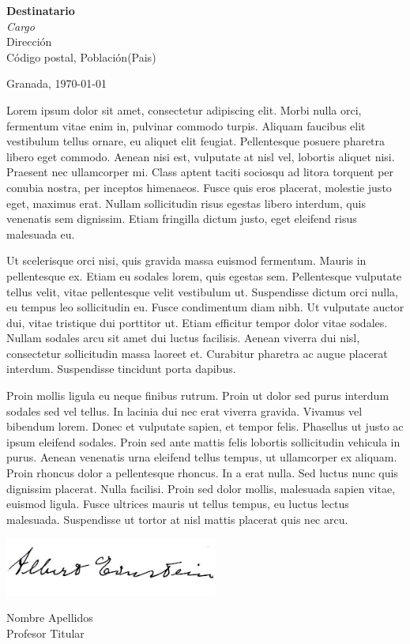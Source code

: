\documentclass{UGR-generico}
\newcommand{\miNombre}{Nombre Apellidos\xspace}
\newcommand{\miCargo}{Profesor Titular\xspace}
\newcommand{\desNombre}{Destinatario\xspace}
\newcommand{\desCargo}{Cargo\xspace}
\newcommand{\desDireccion}{Dirección\xspace}
\newcommand{\desCP}{Código postal\xspace}
\newcommand{\desPoblacion}{Población\xspace}
\newcommand{\desPais}{Pais\xspace}
\begin{document}
\thispagestyle{scrheadings}

\hfill\vfill
\textbf{\desNombre}\\
\textit{\desCargo}\\
\desDireccion \\
\desCP, \desPoblacion (\desPais)
\vfill

Granada, \today
\medskip

Lorem ipsum dolor sit amet, consectetur adipiscing elit. Morbi nulla orci, fermentum vitae enim in, pulvinar commodo turpis. Aliquam faucibus elit vestibulum tellus ornare, eu aliquet elit feugiat. Pellentesque posuere pharetra libero eget commodo. Aenean nisi est, vulputate at nisl vel, lobortis aliquet nisi. Praesent nec ullamcorper mi. Class aptent taciti sociosqu ad litora torquent per conubia nostra, per inceptos himenaeos. Fusce quis eros placerat, molestie justo eget, maximus erat. Nullam sollicitudin risus egestas libero interdum, quis venenatis sem dignissim. Etiam fringilla dictum justo, eget eleifend risus malesuada eu.

Ut scelerisque orci nisi, quis gravida massa euismod fermentum. Mauris in pellentesque ex. Etiam eu sodales lorem, quis egestas sem. Pellentesque vulputate tellus velit, vitae pellentesque velit vestibulum ut. Suspendisse dictum orci nulla, eu tempus leo sollicitudin eu. Fusce condimentum diam nibh. Ut vulputate auctor dui, vitae tristique dui porttitor ut. Etiam efficitur tempor dolor vitae sodales. Nullam sodales arcu sit amet dui luctus facilisis. Aenean viverra dui nisl, consectetur sollicitudin massa laoreet et. Curabitur pharetra ac augue placerat interdum. Suspendisse tincidunt porta dapibus.

Proin mollis ligula eu neque finibus rutrum. Proin ut dolor sed purus interdum sodales sed vel tellus. In lacinia dui nec erat viverra gravida. Vivamus vel bibendum lorem. Donec et vulputate sapien, et tempor felis. Phasellus ut justo ac ipsum eleifend sodales. Proin sed ante mattis felis lobortis sollicitudin vehicula in purus. Aenean venenatis urna eleifend tellus tempus, ut ullamcorper ex aliquam. Proin rhoncus dolor a pellentesque rhoncus. In a erat nulla. Sed luctus nunc quis dignissim placerat. Nulla facilisi. Proin sed dolor mollis, malesuada sapien vitae, euismod ligula. Fusce ultrices mauris ut tellus tempus, eu luctus lectus malesuada. Suspendisse ut tortor at nisl mattis placerat quis nec arcu. 

\vfill\vfill
\begin{center}

  \includegraphics[width=7cm]{img/firma}

  \begin{bfseries}
  \miNombre\\\smallskip
  \miCargo
  \end{bfseries}
\end{center}
\vfill



%
\end{document}
